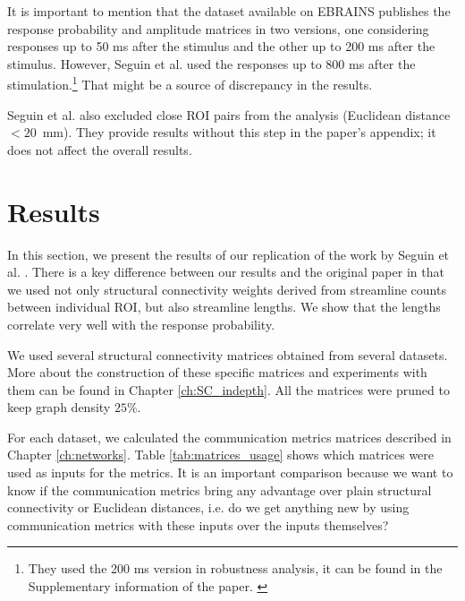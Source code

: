 It is important to mention that the dataset available on EBRAINS publishes the response probability and amplitude matrices in two versions, one considering responses up to 50 ms after the stimulus and the other up to 200 ms after the stimulus. However, Seguin et al. used the responses up to 800 ms after the stimulation.\footnote{They used the 200 ms version in robustness analysis, it can be found in the Supplementary information of the paper. \cite{seguin_communication_2023} } That might be a source of discrepancy in the results.

Seguin et al. also excluded close ROI pairs from the analysis (Euclidean distance $<20$~mm). They provide results without this step in the paper's appendix; it does not affect the overall results. 

\section{Results}\label{sec:ftract_results}

In this section, we present the results of our replication of the work by Seguin et al. \cite{seguin_communication_2023}. There is a key difference between our results and the original paper in that we used not only structural connectivity weights derived from streamline counts between individual ROI, but also streamline lengths. We show that the lengths correlate very well with the response probability.

We used several structural connectivity matrices obtained from several datasets. More about the construction of these specific matrices and experiments with them can be found in Chapter \ref{ch:SC_indepth}. All the matrices were pruned to keep graph density $25\%$.

For each dataset, we calculated the communication metrics matrices described in Chapter \ref{ch:networks}. Table \ref{tab:matrices_usage} shows which matrices were used as inputs for the metrics. It is an important comparison because we want to know if the communication metrics bring any advantage over plain structural connectivity or Euclidean distances, i.e. do we get anything new by using communication metrics with these inputs over the inputs themselves? 

